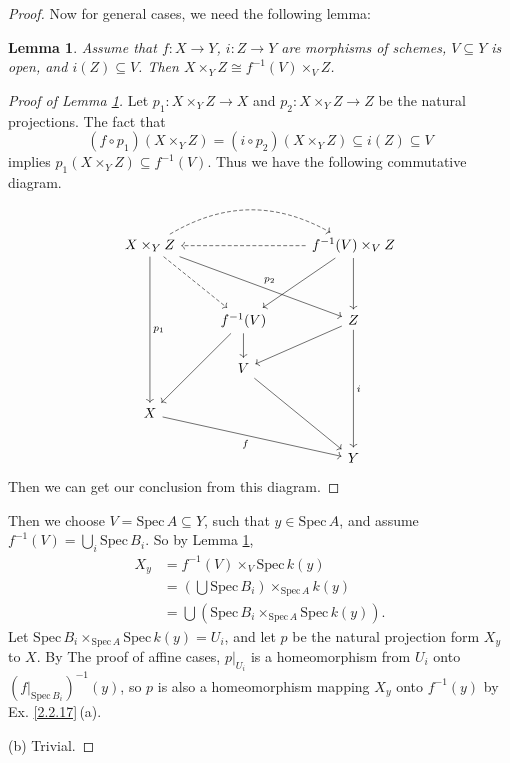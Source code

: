 \documentclass[12pt]{amsart}
\newtheorem{lm}[theorem]{Lemma}
\begin{document}
\begin{proof}
	Now for general cases, we need the following lemma:
	\begin{lm}
		\label{l12}
		Assume that $f:X\rightarrow Y$, $i:Z\rightarrow Y$ are morphisms of schemes, $V\subseteq Y$ is open, and $i(Z)\subseteq V$. Then $X\times_YZ\cong f^{-1}(V)\times_VZ$.
	\end{lm}
    \begin{proof}[Proof of Lemma \ref*{l12}]
    	Let $p_1:X\times_YZ\to X$ and $p_2:X\times_YZ\to Z$ be the natural projections. The fact that $$(f\circ p_1)(X\times_YZ)=(i\circ p_2)(X\times_YZ)\subseteq i(Z)\subseteq V$$implies $p_1(X\times_YZ)\subseteq f^{-1}(V)$. Thus we have the following commutative diagram.
    	\begin{equation*}
    	\begin{tikzcd}
    	X\times_YZ \arrow[dddd, "p_1"] \arrow[rrdd, "p_2"] \arrow[rdd, dashed] \arrow[rr, dashed, bend left] &                                 & f^{-1}(V)\times_VZ \arrow[ldd] \arrow[dd] \arrow[ll, dashed] \\
    	&                                 &                                                              \\
    	& f^{-1}(V) \arrow[ldd] \arrow[d] & Z \arrow[ddd, "i"] \arrow[ld]                                \\
    	& V \arrow[rdd]                   &                                                              \\
    	X \arrow[rrd, "f"']                                                                                  &                                 &                                                              \\
    	&                                 & Y                                                           
    	\end{tikzcd}
    	\end{equation*}
    	Then we can get our conclusion from this diagram.
    \end{proof}
	Then we choose $V=\mathrm{Spec}\, A\subseteq Y$, such that $y\in \mathrm{Spec}\, A$, and assume $f^{-1}(V)=\bigcup_i \mathrm{Spec}\, B_i$.
	So by Lemma \ref{l12},
	\begin{align*}
	X_y&=f^{-1}(V)\times_V\mathrm{Spec}\,k(y)\\
	&=\left(\bigcup \mathrm{Spec}\, B_i\right)\times_{\mathrm{Spec}\, A}k(y)\\
	&=\bigcup (\mathrm{Spec}\, B_i\times_{\mathrm{Spec}\, A}\mathrm{Spec}\,k(y)).
	\end{align*}
	Let $\mathrm{Spec}\, B_i\times_{\mathrm{Spec}\,A}\mathrm{Spec}\,k(y)=U_i$, and let $p$ be the natural
	projection form $X_y$ to $X$. By The proof of affine cases, $p|_{U_i}$ is a homeomorphism from $U_i$ onto $(f|_{\mathrm{Spec}\, B_i})^{-1}(y)$, so $p$ is also a homeomorphism mapping $X_y$ onto $f^{-1}(y)$ by Ex. \ref{2.2.17}\,(a).
	
	(b) Trivial.
\end{proof}
\end{document}
